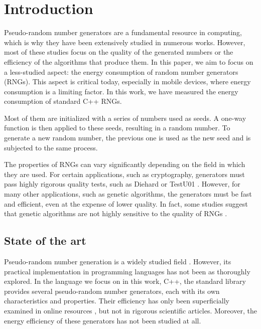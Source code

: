 \documentclass[dvipsnames,format=sigconf]{acmart}
\begin{document}

\maketitle

\section{Introduction}
\label{sec:introduction}

Pseudo-random number generators \cite{marsaglia2003random} are a fundamental resource in computing, which is why they have been extensively studied in numerous works. However, most of these studies focus on the quality of the generated numbers or the efficiency of the algorithms that produce them. In this paper, we aim to focus on a less-studied aspect: the energy consumption of random number generators (RNGs). This aspect is critical today, especially in mobile devices, where energy consumption is a limiting factor. In this work, we have measured the energy consumption of standard C++ RNGs.

Most of them are initialized with a series of numbers used as seeds. A one-way function is then applied to these seeds, resulting in a random number. To generate a new random number, the previous one is used as the new seed and is subjected to the same process.

The properties of RNGs can vary significantly depending on the field in which they are used. For certain applications, such as cryptography, generators must pass highly rigorous quality tests, such as Diehard \cite{marsaglia1997diehard} or TestU01 \cite{testu01}. However, for many other applications, such as genetic algorithms, the generators must be fast and efficient, even at the expense of lower quality. In fact, some studies suggest that genetic algorithms are not highly sensitive to the quality of RNGs \cite{cardenas2011sensitiveness}.

\subsection{State of the art}
\label{sec:state-of-the-art}

Pseudo-random number generation is a widely studied field \cite{marsaglia2003random}. However, its practical implementation in programming languages has not been as thoroughly explored. In the language we focus on in this work, C++, the standard library provides several pseudo-random number generators, each with its own characteristics and properties. Their efficiency has only been superficially examined in online resources \cite{kd9f9-2020,arbelaez-2016}, but not in rigorous scientific articles. Moreover, the energy efficiency of these generators has not been studied at all.
\end{document}
